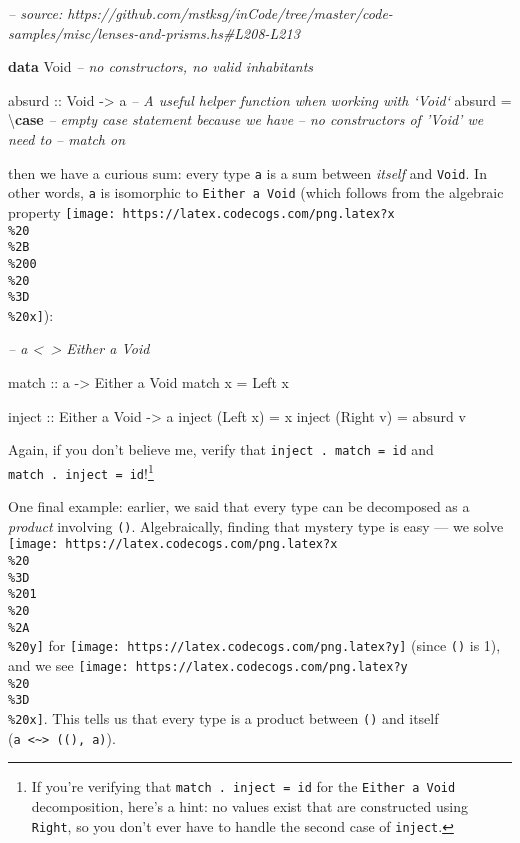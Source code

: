 \documentclass[]{article}
\newenvironment{Shaded}{}{}
\newcommand{\CommentTok}[1]{\textcolor[rgb]{0.38,0.63,0.69}{\textit{#1}}}
\newcommand{\DataTypeTok}[1]{\textcolor[rgb]{0.56,0.13,0.00}{#1}}
\newcommand{\FunctionTok}[1]{\textcolor[rgb]{0.02,0.16,0.49}{#1}}
\newcommand{\KeywordTok}[1]{\textcolor[rgb]{0.00,0.44,0.13}{\textbf{#1}}}
\newcommand{\NormalTok}[1]{#1}
\newcommand{\OtherTok}[1]{\textcolor[rgb]{0.00,0.44,0.13}{#1}}
\begin{document}
\begin{Shaded}
\begin{Highlighting}[]
\CommentTok{-- source: https://github.com/mstksg/inCode/tree/master/code-samples/misc/lenses-and-prisms.hs#L208-L213}

\KeywordTok{data} \DataTypeTok{Void}           \CommentTok{-- no constructors, no valid inhabitants}

\OtherTok{absurd ::} \DataTypeTok{Void} \OtherTok{->}\NormalTok{ a     }\CommentTok{-- A useful helper function when working with `Void`}
\NormalTok{absurd }\FunctionTok{=}\NormalTok{ \textbackslash{}}\KeywordTok{case} \CommentTok{-- empty case statement because we have}
               \CommentTok{-- no constructors of 'Void' we need to}
               \CommentTok{-- match on}
\end{Highlighting}
\end{Shaded}

then we have a curious sum: every type \texttt{a} is a sum between \emph{itself}
and \texttt{Void}. In other words, \texttt{a} is isomorphic to
\texttt{Either\ a\ Void} (which follows from the algebraic property
\texttt{[image: https://latex.codecogs.com/png.latex?x\\\%20\\\%2B\\\%200\\\%20\\\%3D\\\%20x]}):

\begin{Shaded}
\begin{Highlighting}[]
\CommentTok{-- a <~> Either a Void}

\OtherTok{match ::}\NormalTok{ a }\OtherTok{->} \DataTypeTok{Either}\NormalTok{ a }\DataTypeTok{Void}
\NormalTok{match x }\FunctionTok{=} \DataTypeTok{Left}\NormalTok{ x}

\OtherTok{inject ::} \DataTypeTok{Either}\NormalTok{ a }\DataTypeTok{Void} \OtherTok{->}\NormalTok{ a}
\NormalTok{inject (}\DataTypeTok{Left}\NormalTok{  x) }\FunctionTok{=}\NormalTok{ x}
\NormalTok{inject (}\DataTypeTok{Right}\NormalTok{ v) }\FunctionTok{=}\NormalTok{ absurd v}
\end{Highlighting}
\end{Shaded}

Again, if you don't believe me, verify that \texttt{inject\ .\ match\ =\ id} and
\texttt{match\ .\ inject\ =\ id}!\footnote{If you're verifying that
  \texttt{match\ .\ inject\ =\ id} for the \texttt{Either\ a\ Void}
  decomposition, here's a hint: no values exist that are constructed using
  \texttt{Right}, so you don't ever have to handle the second case of
  \texttt{inject}.}

One final example: earlier, we said that every type can be decomposed as a
\emph{product} involving \texttt{()}. Algebraically, finding that mystery type
is easy --- we solve
\texttt{[image: https://latex.codecogs.com/png.latex?x\\\%20\\\%3D\\\%201\\\%20\\\%2A\\\%20y]}
for \texttt{[image: https://latex.codecogs.com/png.latex?y]} (since \texttt{()}
is 1), and we see
\texttt{[image: https://latex.codecogs.com/png.latex?y\\\%20\\\%3D\\\%20x]}. This
tells us that every type is a product between \texttt{()} and itself
(\texttt{a\ \textless{}\textasciitilde{}\textgreater{}\ ((),\ a)}).
\end{document}
